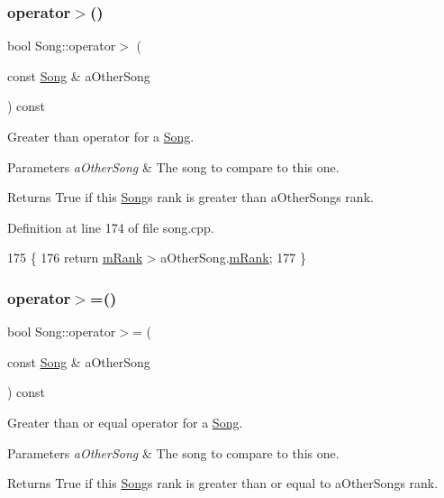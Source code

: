 \subsubsection{\texorpdfstring{operator$>$()}{operator>()}}
{\footnotesize\ttfamily bool Song\+::operator$>$ (\begin{DoxyParamCaption}\item[{const \mbox{\hyperlink{class_song}{Song}} \&}]{a\+Other\+Song }\end{DoxyParamCaption}) const}



Greater than operator for a \mbox{\hyperlink{class_song}{Song}}. 


\begin{DoxyParams}{Parameters}
{\em a\+Other\+Song} & The song to compare to this one. \\
\hline
\end{DoxyParams}
\begin{DoxyReturn}{Returns}
True if this \mbox{\hyperlink{class_song}{Song}}\textquotesingle{}s rank is greater than a\+Other\+Song\textquotesingle{}s rank. 
\end{DoxyReturn}


Definition at line 174 of file song.\+cpp.


\begin{DoxyCode}
175 \{
176     \textcolor{keywordflow}{return} \mbox{\hyperlink{class_song_a18b47d2545fc5e7795cad143092c97e7}{mRank}} > aOtherSong.\mbox{\hyperlink{class_song_a18b47d2545fc5e7795cad143092c97e7}{mRank}};
177 \}
\end{DoxyCode}
\mbox{\label{class_song_aa51d7041e3cb45d2e8cd3e04eac3a16f}} 
\subsubsection{\texorpdfstring{operator$>$=()}{operator>=()}}
{\footnotesize\ttfamily bool Song\+::operator$>$= (\begin{DoxyParamCaption}\item[{const \mbox{\hyperlink{class_song}{Song}} \&}]{a\+Other\+Song }\end{DoxyParamCaption}) const}



Greater than or equal operator for a \mbox{\hyperlink{class_song}{Song}}. 


\begin{DoxyParams}{Parameters}
{\em a\+Other\+Song} & The song to compare to this one. \\
\hline
\end{DoxyParams}
\begin{DoxyReturn}{Returns}
True if this \mbox{\hyperlink{class_song}{Song}}\textquotesingle{}s rank is greater than or equal to a\+Other\+Song\textquotesingle{}s rank. 
\end{DoxyReturn}


